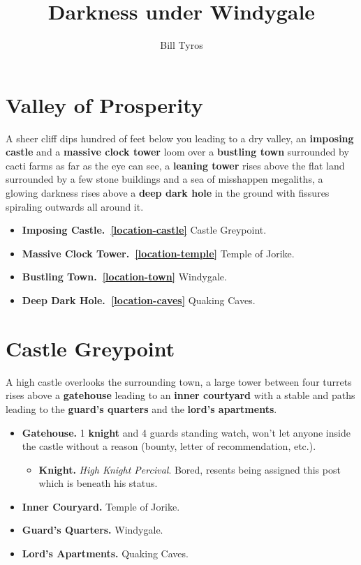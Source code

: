 \documentclass[letterpaper]{article}
\title{Darkness under Windygale}
\author{Bill Tyros}
\date{\vspace{-5ex}}
\begin{document}
	\begin{multicols}{2}
	\maketitle
	\section{Valley of Prosperity}
		\begin{mdframed}[style=BoxedText]
		        A sheer cliff dips hundred of feet below you leading to a dry valley, an \textbf{imposing castle} and a \textbf{massive clock tower} loom over a \textbf{bustling town} surrounded by cacti farms as far as the eye can see, a \textbf{leaning tower} rises above the flat land surrounded by a few stone buildings and a sea of misshappen megaliths, a glowing darkness rises above a \textbf{deep dark hole} in the ground with fissures spiraling outwards all around it.
		\end{mdframed}
		\begin{itemize}
		  \item \textbf{Imposing Castle.~\vref{location-castle}} Castle Greypoint.
		  \item \textbf{Massive Clock Tower.~\vref{location-temple}} Temple of Jorike.
		  \item \textbf{Bustling Town.~\vref{location-town}} Windygale.
		  \item \textbf{Deep Dark Hole.~\vref{location-caves}} Quaking Caves.
		\end{itemize}
		\section{Castle Greypoint~\label{location-castle}}
				\begin{mdframed}[style=BoxedText]
					A high castle overlooks the surrounding town, a large tower between four turrets rises above a \textbf{gatehouse} leading to an \textbf{inner courtyard} with a stable and paths leading to the \textbf{guard's quarters} and the \textbf{lord's apartments}.
				\end{mdframed}
					 \begin{itemize}
						  \item \textbf{Gatehouse.} 1 \textbf{knight} and 4 guards standing watch, won't let anyone inside the castle without a reason (bounty, letter of recommendation, etc.).
						  \begin{itemize}
						  	\item \textbf{Knight.} \textit{High Knight Percival}. Bored, resents being assigned this post which is beneath his status.
						  \end{itemize}
						  \item \textbf{Inner Couryard.} Temple of Jorike.
						  \item \textbf{Guard's Quarters.} Windygale.
						  \item \textbf{Lord's Apartments.} Quaking Caves.
				 \end{itemize}


\end{multicols}
\end{document}
